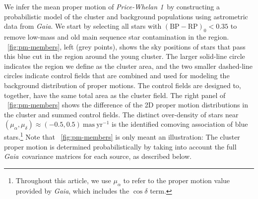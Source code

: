 \documentclass[twocolumn]{aastex62}
\newcommand{\gaia}{\textsl{Gaia}}
\newcommand{\masyr}{\ensuremath{\textrm{mas}~\textrm{yr}^{-1}}}
\newcommand{\clustername}{\textsl{Price-Whelan 1}}
\newcommand{\bprp}{\ensuremath{\textrm{BP} - \textrm{RP}}}
\begin{document}
We infer the mean proper motion of \clustername\ by constructing a probabilistic model of the cluster and background populations using astrometric data from \gaia.
We start by selecting all stars with $(\bprp)_0 < 0.35$ to remove low-mass and old main sequence star contamination in the region.
\figurename~\ref{fig:pm-members}, left (grey points), shows the sky positions of stars that pass this blue cut in the region around the young cluster.
The larger solid-line circle indicates the region we define as the cluster area, and the two smaller dashed-line circles indicate control fields that are combined and used for modeling the background distribution of proper motions.
The control fields are designed to, together, have the same total area as the cluster field.
The right panel of \figurename~\ref{fig:pm-members} shows the difference of the 2D proper motion distributions in the cluster and summed control fields.
The distinct over-density of stars near $(\mu_\alpha, \mu_\delta) \approx (-0.5, 0.5)~\masyr$ is the identified comoving association of blue stars.\footnote{Throughout this article, we use $\mu_\alpha$ to refer to the proper motion value provided by \gaia, which includes the $\cos\delta$ term.}
Note that \figurename~\ref{fig:pm-members} is only meant an illustration: The cluster proper motion is determined probabilistically by taking into account the full \gaia\ covariance matrices for each source, as described below.
\end{document}
